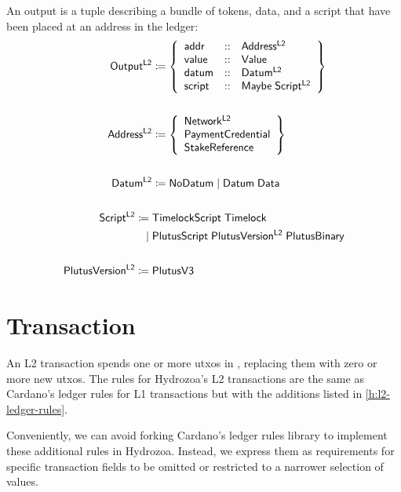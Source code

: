 \documentclass[../hydrozoa.tex]{subfiles}
\begin{document}
An output is a tuple describing a bundle of tokens, data, and a script that have been placed at an address in the ledger:
\begin{equation*}
\begin{split}
  \mathsf{Output^{L2}} &\coloneq \left\{
  \begin{array}{lll}
    \mathsf{addr} &::& \mathsf{Address^{L2}} \\
      \mathsf{value} &::& \mathsf{Value} \\
      \mathsf{datum} &::& \mathsf{Datum^{L2}} \\
      \mathsf{script} &::& \mathsf{Maybe} \; \mathsf{Script^{L2}}
  \end{array} \right\} \\\\
  \mathsf{Address^{L2}} &\coloneq \left\{
    \begin{array}{l}
      \mathsf{Network^{L2}} \\
      \mathsf{PaymentCredential} \\
      \mathsf{StakeReference}
    \end{array}\right\} \\\\
  \mathsf{Datum^{L2}} &\coloneq \mathsf{NoDatum} \mid \mathsf{Datum} \; \mathsf{Data} \\\\
  \mathsf{Script^{L2}} \coloneq\;& \mathsf{TimelockScript} \; \mathsf{Timelock} \\
                        \mid\;& \mathsf{PlutusScript} \; \mathsf{PlutusVersion^{L2}} \; \mathsf{PlutusBinary} \\\\
  \mathsf{PlutusVersion^{L2}} \coloneq\;& \mathsf{PlutusV3}
\end{split}
\end{equation*}

\section{Transaction}%
\label{h:ledger-transaction}%

An L2 transaction spends one or more utxos in , replacing them with zero or more new utxos.
The rules for Hydrozoa's L2 transactions are the same as Cardano's ledger rules for L1 transactions but with the additions listed in \cref{h:l2-ledger-rules}.

Conveniently, we can avoid forking Cardano's ledger rules library to implement these additional rules in Hydrozoa.
Instead, we express them as requirements for specific transaction fields to be omitted or restricted to a narrower selection of values.
\end{document}
